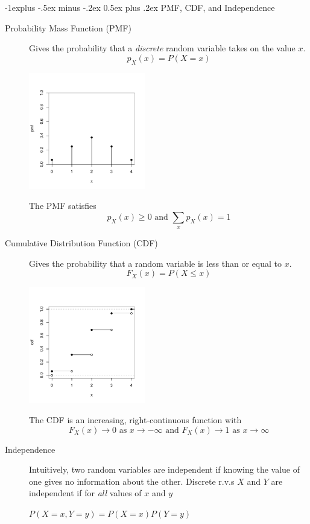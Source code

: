 \documentclass[10pt,landscape]{article}
\makeatletter
\renewcommand{\subsection}{\@startsection{subsection}{2}{0mm}%
                                {-1explus -.5ex minus -.2ex}%
                                {0.5ex plus .2ex}%
                                {\normalfont\normalsize\bfseries}}
\makeatother
\begin{document}
\begin{multicols*}{3}
\subsection{PMF, CDF, and Independence}
\begin{description}

\item[Probability Mass Function (PMF)] 
Gives the probability that a \emph{discrete} random variable takes on the value $x$.
\[ p_X(x) = P(X=x) \]
\begin{minipage}{\linewidth}
            \centering
\includegraphics[width=2in]{figures/Binpmf.pdf}
        \end{minipage}
The PMF satisfies
\[p_X(x) \geq 0 \textrm{ and } \sum_x p_X(x) = 1 \]


\item[Cumulative Distribution Function (CDF)] 
Gives the probability that a random variable is less than or equal to $x$.
\[F_X(x) = P(X \leq x)\]
\begin{minipage}{\linewidth}
            \centering
\includegraphics[width=2in]{figures/Bincdf.pdf}
        \end{minipage}

The CDF is an increasing, right-continuous function with
\[F_X(x) \to 0 \textrm{ as $x \to -\infty$ and } F_X(x) \to 1 \textrm{ as $x \to \infty$} \]
\item[Independence] Intuitively, two random variables are independent if knowing the value of one gives  no information about the other. Discrete r.v.s $X$ and $Y$ are independent if for \emph{all} values of $x$ and $y$  \begin{center}
$P(X=x, Y=y) = P(X = x)P(Y = y)$
\end{center}


\end{description}
\end{multicols*}
\end{document}

